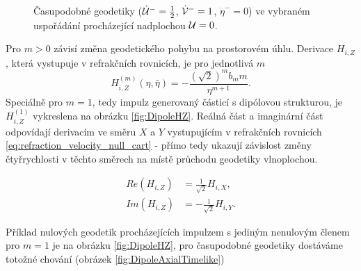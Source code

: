 \begin{figure}[ht]
    \centering
    \caption{Časupodobné geodetiky ($\dot {\mathcal{U}}^-=\frac{1}{2}$, $\dot {\mathcal{V}}^-=1$, $\dot \eta^-=0$) ve vybraném uspořádání procházející nadplochou $\mathcal{U} = 0$.}
    \label{fig:AsMatterNonAxial}
\end{figure}
Pro $m>0$ závisí změna geodetického pohybu na prostorovém úhlu. Derivace $H_{i,Z}$, která vystupuje v refrakčních rovnicích, je pro jednotlivá $m$
\begin{equation}
    H_{i,Z}^{(m)}(\eta, \bar{\eta}) = -\frac{(\sqrt{2})^{m} b_m m}{\eta^{m+1}}.
\end{equation}
Speciálně pro $m=1$, tedy impulz generovaný částicí s dipólovou strukturou, je $H_{i,Z}^{(1)}$ vykreslena na obrázku \ref{fig:DipoleHZ}. Reálná část a imaginární část
odpovídají derivacím ve směru $X$ a $Y$ vystupujícím v refrakčních rovnicích \eqref{eq:refraction_velocity_null_cart} - přímo tedy ukazují závislost změny čtyřrychlosti v těchto směrech na místě průchodu geodetiky vlnoplochou.

\begin{equation}
    \begin{split}
        Re(H_{i,Z}) &= \frac{1}{\sqrt{2}} H_{i,X}, \\
        Im(H_{i,Z}) &=-\frac{1}{\sqrt{2}}H_{i,Y}.
    \end{split}
\end{equation}


Příklad nulových geodetik procházejících impulzem s jediným nenulovým členem pro $m=1$ je na obrázku \ref{fig:DipoleHZ}, pro časupodobné geodetiky dostáváme totožné
chování (obrázek \ref{fig:DipoleAxialTimelike})

